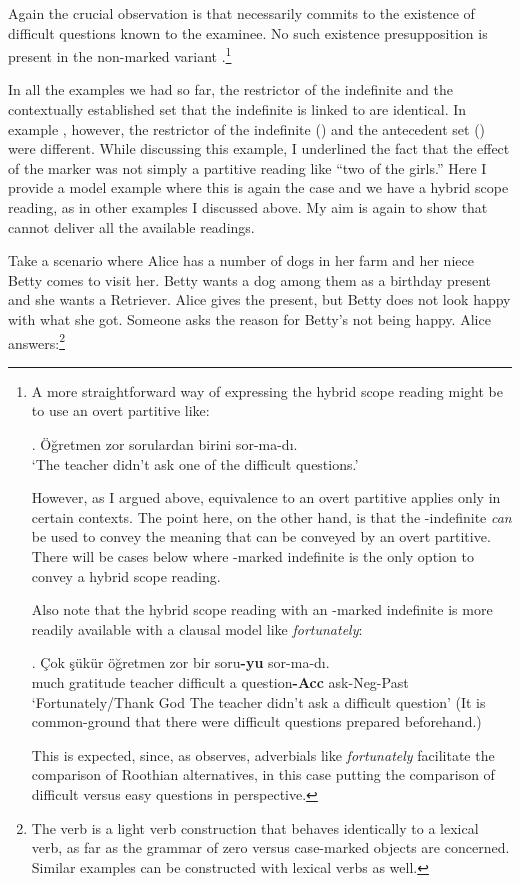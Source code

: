 \documentclass[11pt,a4paper]{article}
\begin{document}
Again the crucial observation is that  necessarily
commits to the existence of difficult questions known to the examinee. No
such existence presupposition is present in the non-marked variant
.\footnote{A more straightforward way of
		expressing the hybrid scope reading might be to use an overt
		partitive like:

		\ex. Öğretmen zor sorulardan birini sor-ma-dı.\\
		`The teacher didn't ask one of the difficult questions.'

		However, as I argued above, equivalence to an overt partitive
		applies only in certain contexts. The point here, on the other
		hand, is that the \acc-indefinite \emph{can} be used to convey
		the meaning that can be conveyed by an overt partitive.  There
		will be cases below where \acc-marked indefinite is the only
		option to convey a hybrid scope reading.

		Also note that the hybrid scope reading with an \acc-marked
		indefinite is more readily available with a clausal model like
		\emph{fortunately}: 

		\exg. Çok şükür öğretmen zor bir soru{\bf-yu} sor-ma-dı.\\
		much gratitude teacher difficult a question{\bf-Acc} ask-Neg-Past\\
		`Fortunately/Thank God The teacher didn't ask a difficult question'
		(It is common-ground that there were difficult questions prepared
		beforehand.)

		This is expected, since, as  observes,
		adverbials like \emph{fortunately} facilitate the comparison of
		Roothian alternatives, in this case putting the comparison of
		difficult versus easy questions in perspective.}

In all the examples we had so far, the restrictor of the indefinite
and the contextually established set that the indefinite is linked to
are identical. In  example , however, the
restrictor of the indefinite () and the antecedent set
() were different. While discussing this example, I
underlined the fact that the effect of the marker was not simply a
partitive reading like ``two of the girls.'' Here I provide a model
example where this is again the case and we have a hybrid scope
reading, as in other examples I discussed above. My aim is again to
show that  cannot deliver all the available
readings.
 
Take a scenario where Alice has a number of dogs in her farm and her
niece Betty comes to visit her. Betty wants a dog among them as a
birthday present and she wants a Retriever. Alice gives the present,
but Betty does not look happy with what she got. Someone asks the
reason for Betty's not being happy.  Alice answers:\footnote{The verb
		 is a light verb construction
		that behaves identically to a lexical verb, as far as the
grammar of zero versus case-marked objects are concerned.  Similar examples
can be constructed with lexical verbs as well.}
\end{document}
